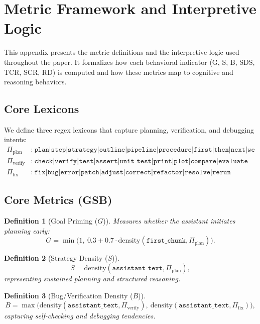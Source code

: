 \documentclass[11pt]{article}
\newtheorem{definition}{Definition}
\newcommand{\density}{\mathrm{density}}
\newcommand{\plan}{\Pi_{\text{plan}}}
\newcommand{\verify}{\Pi_{\text{verify}}}
\newcommand{\fix}{\Pi_{\text{fix}}}
\begin{document}
\clearpage
\appendix
\section{Metric Framework and Interpretive Logic}
\label{appendix:metric-framework}

This appendix presents the metric definitions and the interpretive logic used throughout the paper.
It formalizes how each behavioral indicator (G, S, B, SDS, TCR, SCR, RD) is computed and how these
metrics map to cognitive and reasoning behaviors.

\subsection{Core Lexicons}
We define three regex lexicons that capture planning, verification, and debugging intents:
\begin{align*}
\plan&:\ \texttt{plan|step|strategy|outline|pipeline|procedure|first|then|next|we will} \\
\verify&:\ \texttt{check|verify|test|assert|unit test|print|plot|compare|evaluate} \\
\fix&:\ \texttt{fix|bug|error|patch|adjust|correct|refactor|resolve|rerun}
\end{align*}

\subsection{Core Metrics (GSB)}
\begin{definition}[Goal Priming ($G$)]
Measures whether the assistant initiates planning early:
\[
G = \min\!\bigl(1,\ 0.3 + 0.7 \cdot \density(\texttt{first\_chunk}, \plan)\bigr).
\]
\end{definition}

\begin{definition}[Strategy Density ($S$)]
\[
S = \density(\texttt{assistant\_text}, \plan),
\]
representing sustained planning and structured reasoning.
\end{definition}

\begin{definition}[Bug/Verification Density ($B$)]
\[
B = \max\!\bigl(\density(\texttt{assistant\_text}, \verify),\ \density(\texttt{assistant\_text}, \fix)\bigr),
\]
capturing self-checking and debugging tendencies.
\end{definition}
\end{document}
